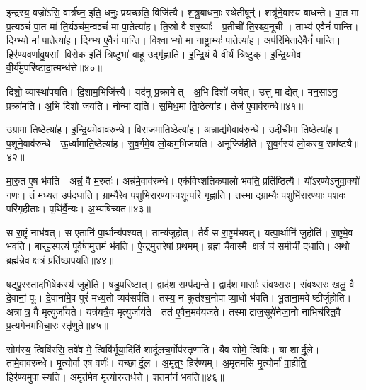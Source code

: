 इन्द्र॑स्य॒ वज्रो॑ऽसि॒ वार्त्र॑घ्न॒ इति॒ धनुः॒ प्रय॑च्छति॒ विजि॑त्यै।
श॒त्रु॒बाध॑नाः॒ स्थेतीषून्॑।
शत्रू॑ने॒वास्य॑ बाधन्ते।
पा॒त मा प्र॒त्यञ्चं॑ पा॒त मा॑ ति॒र्यञ्च॑म॒न्वञ्चं॑ मा पा॒तेत्या॑ह।
ति॒स्रो वै श॑र॒व्याः᳚।
प्र॒तीची॑ ति॒रश्च्य॒नूची।
ताभ्य॑ ए॒वैनं॑ पान्ति।
दि॒ग्भ्यो मा॑ पा॒तेत्या॑ह।
दि॒ग्भ्य ए॒वैनं॑ पान्ति।
विश्वाभ्यो मा ना॒ष्ट्राभ्यः॑ पा॒तेत्या॑ह।
अप॑रिमितादे॒वैनं॑ पान्ति।
हिर॑ण्यवर्णावु॒षसां विरो॒क इति॑ त्रि॒ष्टुभा॑ बा॒हू उद्गृ॑ह्णाति।
इ॒न्द्रि॒यं वै वी॒र्यं॑ त्रि॒ष्टुक्।
इ॒न्द्रि॒यमे॒व वी॒र्य॑मु॒परि॑ष्टादा॒त्मन्ध॑त्ते॥४०॥\anuvakamend[व्यावृ॑त्त्यै दा॒त्रम॒सीत्या॑हा॒मृत॒ꣳ॒ हिर॑ण्यमेकश॒तो ग॑मय॒न्त्याह॑ ब्राह्म॒णा ना॒ष्ट्राभ्यः॑ पा॒तेत्या॑ह च॒त्वारि॑ च]

दिशो॒ व्यास्था॑पयति।
दि॒शाम॒भिजि॑त्त्यै।
यद॑नु प्र॒क्रामेत्।
अ॒भि दिशो॑ जयेत्।
उत्तु माद्येत्।
मन॒साऽनु॒ प्रक्रा॑मति।
अ॒भि दिशो॑ जयति।
नोन्माद्यति।
स॒मिध॒मा ति॒ष्ठेत्या॑ह।
तेज॑ ए॒वाव॑रुन्धे॥४१॥

उ॒ग्रामा ति॒ष्ठेत्या॑ह।
इ॒न्द्रि॒यमे॒वाव॑रुन्धे।
वि॒राज॒माति॒ष्ठेत्या॑ह।
अ॒न्नाद्य॑मे॒वाव॑रुन्धे।
उदी॑ची॒मा ति॒ष्ठेत्या॑ह।
प॒शूने॒वाव॑रुन्धे।
ऊ॒र्ध्वामाति॒ष्ठेत्या॑ह।
सु॒व॒र्गमे॒व लो॒कम॒भिज॑यति।
अनूज्जि॑हीते।
सु॒व॒र्गस्य॑ लो॒कस्य॒ सम॑ष्ट्यै॥४२॥

मा॒रु॒त ए॒ष भ॑वति।
अन्नं॒ वै म॒रुतः॑।
अन्न॑मे॒वाव॑रुन्धे।
एक॑विꣳशतिकपालो भवति॒ प्रति॑ष्ठित्यै।
यो॑ऽरण्ये\-ऽनुवा॒क्यो॑ ग॒णः।
तं म॑ध्य॒त उप॑दधाति।
ग्रा॒म्यैरे॒व प॒शुभि॑रार॒ण्यान्प॒शू\-न्परि॑ गृह्णाति।
तस्माद्ग्रा॒म्यैः प॒शुभि॑रार॒ण्याः प॒शवः॒ परि॑गृहीताः।
पृथि॑र्वै॒न्यः।
अ॒भ्य॑षिच्यत॥४३॥

स रा॒ष्ट्रं नाभ॑वत्।
स ए॒तानि॑ पा॒र्थान्य॑पश्यत्।
तान्य॑जुहोत्।
तैर्वै स रा॒ष्ट्रम॑भवत्।
यत्पा॒र्थानि॑ जु॒होति॑।
रा॒ष्ट्रमे॒व भ॑वति।
बा॒र्॒ह॒स्प॒त्यं पूर्वे॑षामुत्त॒मं भ॑वति।
ऐ॒न्द्रमुत्त॑रेषां प्रथ॒मम्।
ब्रह्म॑ चै॒वास्मै क्ष॒त्रं च॑ स॒मीची॑ दधाति।
अथो॒ ब्रह्म॑न्ने॒व क्ष॒त्रं प्रति॑ष्ठापयति॥४४॥

षट्पु॒रस्ता॑दभिषे॒कस्य॑ जुहोति।
षडु॒परि॑ष्टात्।
द्वाद॑श॒ सम्प॑द्यन्ते।
द्वाद॑श॒ मासाः᳚ संवथ्स॒रः।
सं॒व॒थ्स॒रः खलु॒ वै दे॒वानां॒ पूः।
दे॒वाना॑मे॒व पुरं॑ मध्य॒तो व्यव॑सर्पति।
तस्य॒ न कुत॑श्च॒नोपाव्या॒धो भ॑वति।
भू॒ताना॒मवेष्टीर्जुहोति।
अत्रात्र॒ वै मृ॒त्युर्जा॑यते।
यत्र॑यत्रै॒व मृ॒त्युर्जाय॑ते।
तत॑ ए॒वैन॒मव॑यजते।
तस्माद्राज॒सूये॑नेजा॒नो नाभिच॑रित॒वै।
प्र॒त्यगे॑नमभिचा॒रः स्तृ॑णुते॥४५॥\anuvakamend[रु॒न्धे॒ सम॑ष्ट्या असिच्यत स्थापयति॒ जाय॑ते॒ पञ्च॑ च]

सोम॑स्य॒ त्विषि॑रसि॒ तवे॑व मे॒ त्विषि॑र्भूया॒दिति॑ शार्दूल\-च॒र्मोप॑स्तृणाति।
यैव सोमे॒ त्विषिः॑।
या शार्दू॒ले।
तामे॒वाव॑रुन्धे।
मृ॒त्योर्वा ए॒ष वर्णः॑।
यच्छार्दू॒लः।
अ॒मृत॒ꣳ॒ हिर॑ण्यम्।
अ॒मृत॑मसि मृ॒त्योर्मा॑ पा॒हीति॒ हिर॑ण्य॒मुपास्यति।
अ॒मृत॑मे॒व मृ॒त्योर॒न्तर्ध॑त्ते।
श॒तमा॑नं भवति॥४६॥

